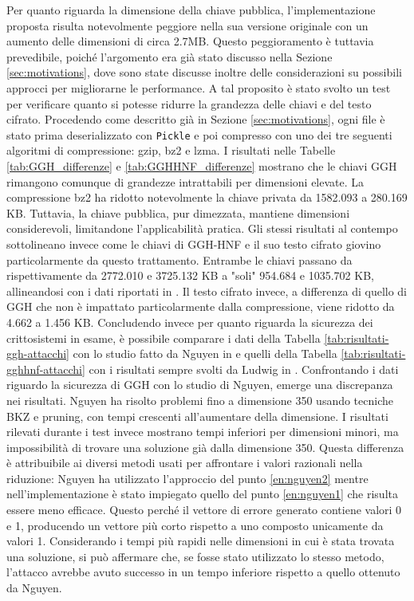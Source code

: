 Per quanto riguarda la dimensione della chiave pubblica, l'implementazione proposta risulta
notevolmente peggiore nella sua versione originale con un aumento delle dimensioni di 
circa 2.7MB. Questo peggioramento è tuttavia prevedibile, poiché l'argomento era già 
stato discusso nella Sezione \ref{sec:motivations}, dove sono state discusse inoltre delle 
considerazioni su possibili approcci per migliorarne le performance. A tal proposito è
stato svolto un test per verificare quanto si potesse ridurre la grandezza delle chiavi e 
del testo cifrato. Procedendo come descritto già in Sezione \ref{sec:motivations}, 
ogni file è stato prima deserializzato con 
\texttt{Pickle} e poi compresso con uno dei tre seguenti algoritmi di compressione: 
gzip, bz2 e lzma. 
I risultati nelle Tabelle \ref{tab:GGH_differenze} e \ref{tab:GGHHNF_differenze} mostrano 
che le chiavi GGH rimangono comunque di grandezze intrattabili per dimensioni elevate. 
La compressione bz2 ha ridotto notevolmente la chiave privata da 1582.093 a 
280.169 KB. Tuttavia, la chiave pubblica, pur dimezzata, mantiene dimensioni 
considerevoli, limitandone l'applicabilità pratica. Gli stessi risultati al contempo 
sottolineano invece come le chiavi di GGH-HNF e il suo testo cifrato giovino 
particolarmente da questo trattamento. Entrambe le chiavi passano da rispettivamente da
2772.010 e 3725.132 KB a "soli" 954.684 e 1035.702 KB, allineandosi con i dati riportati in 
\cite{HNF04}. Il testo cifrato invece, a differenza di quello di GGH che non è impattato 
particolarmente dalla compressione, viene ridotto da 4.662 a 1.456 KB. 
Concludendo invece per quanto riguarda la sicurezza dei crittosistemi in esame, è possibile
comparare i dati della Tabella \ref{tab:risultati-ggh-attacchi} con lo studio fatto da
Nguyen in \cite{Nguyen99} e quelli della Tabella \ref{tab:risultati-gghhnf-attacchi} con 
i risultati sempre svolti da Ludwig in \cite{HNF04}. 
Confrontando i dati riguardo la sicurezza di GGH con lo studio di Nguyen, 
emerge una discrepanza nei risultati. Nguyen ha risolto problemi fino a dimensione 
350 usando tecniche BKZ e pruning, con tempi crescenti all'aumentare della dimensione.
I risultati rilevati durante i test invece mostrano tempi inferiori per dimensioni minori, 
ma impossibilità di trovare una soluzione già dalla dimensione 350.
Questa differenza è attribuibile ai diversi metodi usati per affrontare i valori 
razionali nella riduzione: Nguyen ha utilizzato l'approccio del punto \ref{en:nguyen2} 
mentre nell'implementazione è stato impiegato quello del punto \ref{en:nguyen1} che risulta 
essere meno efficace. Questo perché il vettore di errore generato contiene valori 0 e 1, 
producendo un vettore più corto rispetto a uno composto unicamente da valori 1. 
Considerando i tempi più rapidi nelle dimensioni in cui è stata trovata una soluzione, 
si può affermare che, se fosse stato utilizzato lo stesso metodo, l'attacco avrebbe avuto 
successo in un tempo inferiore rispetto a quello ottenuto da Nguyen. 

